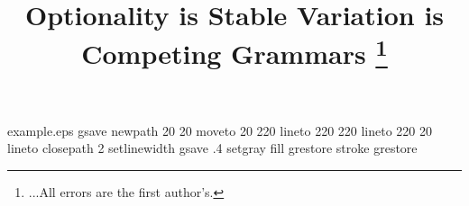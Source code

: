 %
%
%
%
%
\begin{filecontents*}{example.eps}
gsave
newpath
  20 20 moveto
  20 220 lineto
  220 220 lineto
  220 20 lineto
closepath
2 setlinewidth
gsave
  .4 setgray fill
grestore
stroke
grestore
\end{filecontents*}
%
\RequirePackage{fix-cm}
%
\documentclass{svjour3}                     %
%
\smartqed  %
%
\usepackage{mhsetup}
\usepackage{amsmath}
\usepackage{mathtools}
\usepackage{natbib}
\usepackage{graphicx}
\usepackage{float}
\usepackage{xyling}
\usepackage[utf8]{inputenc}
\usepackage{gb4e}
\noautomath
\usepackage[T1]{fontenc}
\usepackage{ tipa }
\usepackage{import}
\usepackage{color}
\usepackage{calc}
\usepackage{subfig}
\newcommand{\notejoel}[1]{\noindent \textbf{[[JCW:  #1 ]]}}
\newcommand{\notejoe}[1]{\noindent \textbf{[[JTF:  #1 ]]}}
\renewcommand{\theequation}{\Alph{equation}}





\title{Optionality is Stable Variation is Competing Grammars
\thanks{...All errors are the first author's.}}



